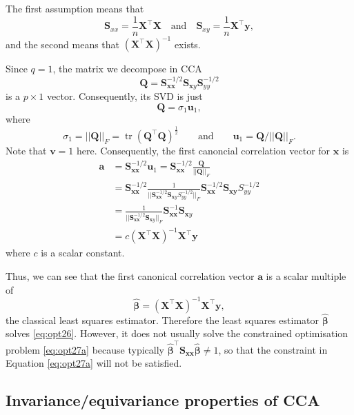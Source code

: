 \documentclass[
]{book}
\theoremstyle{definition}
\theoremstyle{definition}
\theoremstyle{definition}
\theoremstyle{definition}
\theoremstyle{remark}
\begin{document}
The first assumption means that
\[\mathbf S_{xx}=\frac{1}{n}\mathbf X^\top \mathbf X\quad \mbox{and}\quad \mathbf S_{xy}=\frac{1}{n}\mathbf X^\top \mathbf y,\] and the second means that \((\mathbf X^\top \mathbf X)^{-1}\) exists.

Since \(q=1\), the matrix we decompose in CCA
\[
\mathbf Q=\mathbf S_{\mathbf x\mathbf x}^{-1/2} \mathbf S_{\mathbf xy}\mathbf S_{yy}^{-1/2}
\]
is a \(p \times 1\) vector. Consequently, its
SVD is just
\[
\mathbf Q=\sigma_1 \mathbf u_1,
\]
where
\[
\sigma_1=\vert \vert \mathbf Q\vert \vert_F = \operatorname{tr}(\mathbf Q^\top \mathbf Q)^{\frac{1}{2}} \qquad \text{and} \qquad \mathbf u_1=\mathbf Q/\vert \vert \mathbf Q\vert \vert_F.
\]
Note that \(\mathbf v=1\) here.
Consequently, the first canoncial correlation vector for \(\mathbf x\) is
\begin{align*}
\mathbf a&=\mathbf S_{\mathbf x\mathbf x}^{-1/2}\mathbf u_1 =\mathbf S_{\mathbf x\mathbf x}^{-1/2} \frac{\mathbf Q}{||\mathbf Q||_F}\\
&=\mathbf S_{\mathbf x\mathbf x}^{-1/2} \frac{1}{\vert \vert \mathbf S_{\mathbf x\mathbf x}^{-1/2}\mathbf S_{\mathbf xy}S_{yy}^{-1/2}\vert \vert_F}\mathbf S_{\mathbf x\mathbf x}^{-1/2}\mathbf S_{\mathbf x\mathbf y}S_{yy}^{-1/2}\\
&=\frac{1}{\vert \vert \mathbf S_{\mathbf x\mathbf x}^{-1/2}\mathbf S_{\mathbf xy}\vert \vert_F}\mathbf S_{\mathbf x\mathbf x}^{-1}\mathbf S_{\mathbf xy}\\
&= c (\mathbf X^\top \mathbf X)^{-1}\mathbf X^\top \mathbf y
\end{align*}
where \(c\) is a scalar constant.

Thus, we can see that the first canonical correlation vector \(\mathbf a\) is a scalar multiple of
\[
\hat{\pmb \beta}=\left ( \mathbf X^\top \mathbf X\right )^{-1} \mathbf X^\top \mathbf y,
\]
the classical least squares estimator. Therefore the least squares estimator \(\hat{\pmb \beta}\) solves \eqref{eq:opt26}. However, it does not usually solve the constrained optimisation problem \eqref{eq:opt27a} because typically \(\hat{\pmb \beta}^\top \mathbf S_{\mathbf x\mathbf x}\hat{\pmb \beta} \not= 1\), so that the constraint in Equation \eqref{eq:opt27a} will not be satisfied.

\subsection{Invariance/equivariance properties of CCA}\label{invarianceequivariance-properties-of-cca}
\end{document}
